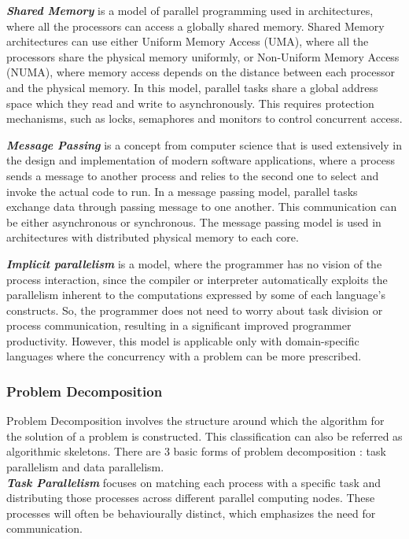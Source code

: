\documentclass[diploma]{Styles/softlab-thesis}
\begin{document}
\textbf{\emph{Shared Memory}} is a model of parallel programming used in architectures, where all the processors can access a globally shared memory. Shared Memory architectures can use either Uniform Memory Access (UMA), where all the processors share the physical memory uniformly, or Non-Uniform Memory Access (NUMA), where memory access depends on the distance between each processor and the physical memory. In this model, parallel tasks share a global address space which they read and write to asynchronously. This requires protection mechanisms, such as locks, semaphores and monitors to control concurrent access.

\textbf{\emph{Message Passing}} is a concept from computer science that is used extensively in the design and implementation of modern software applications, where a process sends a message to another process and relies to the second one to select and invoke the actual code to run. In a message passing model, parallel tasks exchange data through passing message to one another. This communication can be either asynchronous or synchronous. The message passing model is used in architectures with distributed physical memory to each core.

\textbf{\emph{Implicit parallelism}} is a model, where the programmer has no vision of the process interaction, since the compiler or interpreter automatically exploits the parallelism inherent to the computations expressed by some of each language's constructs. So, the programmer does not need to worry about task division or process communication, resulting in a significant improved programmer productivity. However, this model is applicable only with domain-specific languages where the concurrency with a problem can be more prescribed.

\subsubsection{Problem Decomposition}

Problem Decomposition involves the structure around which the algorithm for the solution of a problem is constructed. This classification can also be referred as algorithmic skeletons. There are 3 basic forms of problem decomposition : task parallelism and data parallelism. \\

\textbf{\emph{Task Parallelism}} focuses on matching each process with a specific task and distributing those processes across different parallel computing nodes. These processes will often be behaviourally distinct, which emphasizes the need for communication.
\end{document}

